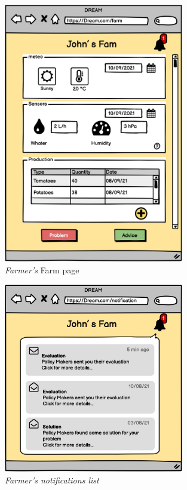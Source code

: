 \begin{figure}[H]
    \begin{center}
    \includegraphics[width=0.7\textwidth]{mocups/FFarm.png}
    \caption{\emph{Farmer's} Farm page}
    \label{fig:sequence1}
    \end{center}
\end{figure}

\begin{figure}[H]
    \begin{center}
    \includegraphics[width=0.7\textwidth]{mocups/Notifications.png}
    \caption{\emph{Farmer's notifications list}}
    \label{fig:sequence1}
    \end{center}
\end{figure}

